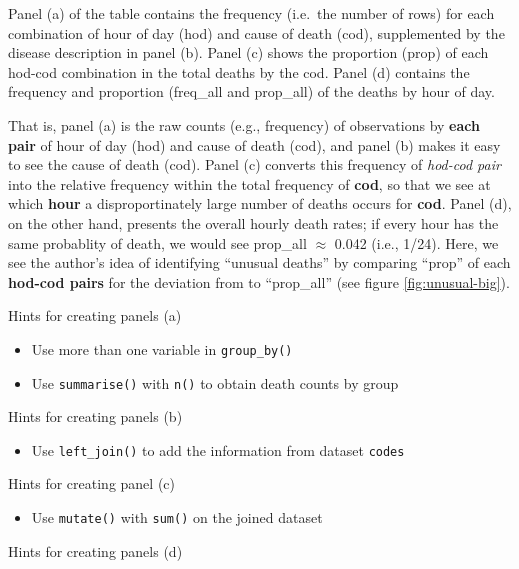 \documentclass[]{book}
\providecommand{\tightlist}{%
  \setlength{\itemsep}{0pt}\setlength{\parskip}{0pt}}
\theoremstyle{definition}
\theoremstyle{definition}
\theoremstyle{remark}
\begin{document}
Panel (a) of the table contains the frequency (i.e.~the number of rows)
for each combination of hour of day (hod) and cause of death (cod),
supplemented by the disease description in panel (b). Panel (c) shows
the proportion (prop) of each hod-cod combination in the total deaths by
the cod. Panel (d) contains the frequency and proportion (freq\_all and
prop\_all) of the deaths by hour of day.

That is, panel (a) is the raw counts (e.g., frequency) of observations
by \textbf{each pair} of hour of day (hod) and cause of death (cod), and
panel (b) makes it easy to see the cause of death (cod). Panel (c)
converts this frequency of \emph{hod-cod pair} into the relative
frequency within the total frequency of \textbf{cod}, so that we see at
which \textbf{hour} a disproportinately large number of deaths occurs
for \textbf{cod}. Panel (d), on the other hand, presents the overall
hourly death rates; if every hour has the same probablity of death, we
would see prop\_all \(\approx\) 0.042 (i.e., 1/24). Here, we see the
author's idea of identifying ``unusual deaths'' by comparing ``prop'' of
each \textbf{hod-cod pairs} for the deviation from to ``prop\_all'' (see
figure \ref{fig:unusual-big}).

Hints for creating panels (a)

\begin{itemize}
\item
  Use more than one variable in \texttt{group\_by()}
\item
  Use \texttt{summarise()} with \texttt{n()} to obtain death counts by
  group
\end{itemize}

Hints for creating panels (b)

\begin{itemize}
\tightlist
\item
  Use \texttt{left\_join()} to add the information from dataset
  \texttt{codes}
\end{itemize}

Hints for creating panel (c)

\begin{itemize}
\tightlist
\item
  Use \texttt{mutate()} with \texttt{sum()} on the joined dataset
\end{itemize}

Hints for creating panels (d)
\end{document}
